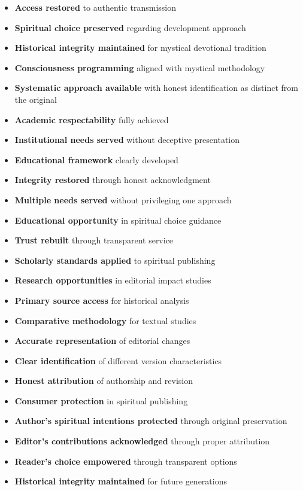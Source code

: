 \documentclass[12pt,twoside]{book}
\begin{document}
\begin{itemize}
\item \textbf{\textbf{Access restored}} to authentic transmission
\item \textbf{\textbf{Spiritual choice preserved}} regarding development approach
\item \textbf{\textbf{Historical integrity maintained}} for mystical devotional tradition
\item \textbf{\textbf{Consciousness programming}} aligned with mystical methodology

\item \textbf{\textbf{Systematic approach available}} with honest identification as distinct from the original
\item \textbf{\textbf{Academic respectability}} fully achieved
\item \textbf{\textbf{Institutional needs served}} without deceptive presentation
\item \textbf{\textbf{Educational framework}} clearly developed

\item \textbf{\textbf{Integrity restored}} through honest acknowledgment
\item \textbf{\textbf{Multiple needs served}} without privileging one approach
\item \textbf{\textbf{Educational opportunity}} in spiritual choice guidance
\item \textbf{\textbf{Trust rebuilt}} through transparent service

\item \textbf{\textbf{Scholarly standards applied}} to spiritual publishing
\item \textbf{\textbf{Research opportunities}} in editorial impact studies
\item \textbf{\textbf{Primary source access}} for historical analysis
\item \textbf{\textbf{Comparative methodology}} for textual studies

\item \textbf{\textbf{Accurate representation}} of editorial changes
\item \textbf{\textbf{Clear identification}} of different version characteristics
\item \textbf{\textbf{Honest attribution}} of authorship and revision
\item \textbf{\textbf{Consumer protection}} in spiritual publishing

\item \textbf{\textbf{Author's spiritual intentions protected}} through original preservation
\item \textbf{\textbf{Editor's contributions acknowledged}} through proper attribution
\item \textbf{\textbf{Reader's choice empowered}} through transparent options
\item \textbf{\textbf{Historical integrity maintained}} for future generations


\end{itemize}
\end{document}
